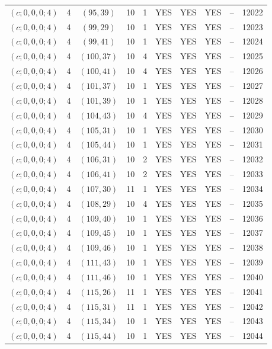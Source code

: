 \begin{longtable}{|c|c|c|c|c|c|c|c|c|c|}
$(c; 0, 0, 0; 4)$ & 4 & $(95, 39)$ & 10 & 1 & YES & YES & YES & -- & 12022\\
$(c; 0, 0, 0; 4)$ & 4 & $(99, 29)$ & 10 & 1 & YES & YES & YES & -- & 12023\\
$(c; 0, 0, 0; 4)$ & 4 & $(99, 41)$ & 10 & 1 & YES & YES & YES & -- & 12024\\
$(c; 0, 0, 0; 4)$ & 4 & $(100, 37)$ & 10 & 4 & YES & YES & YES & -- & 12025\\
$(c; 0, 0, 0; 4)$ & 4 & $(100, 41)$ & 10 & 4 & YES & YES & YES & -- & 12026\\
$(c; 0, 0, 0; 4)$ & 4 & $(101, 37)$ & 10 & 1 & YES & YES & YES & -- & 12027\\
$(c; 0, 0, 0; 4)$ & 4 & $(101, 39)$ & 10 & 1 & YES & YES & YES & -- & 12028\\
$(c; 0, 0, 0; 4)$ & 4 & $(104, 43)$ & 10 & 4 & YES & YES & YES & -- & 12029\\
$(c; 0, 0, 0; 4)$ & 4 & $(105, 31)$ & 10 & 1 & YES & YES & YES & -- & 12030\\
$(c; 0, 0, 0; 4)$ & 4 & $(105, 44)$ & 10 & 1 & YES & YES & YES & -- & 12031\\
$(c; 0, 0, 0; 4)$ & 4 & $(106, 31)$ & 10 & 2 & YES & YES & YES & -- & 12032\\
$(c; 0, 0, 0; 4)$ & 4 & $(106, 41)$ & 10 & 2 & YES & YES & YES & -- & 12033\\
$(c; 0, 0, 0; 4)$ & 4 & $(107, 30)$ & 11 & 1 & YES & YES & YES & -- & 12034\\
$(c; 0, 0, 0; 4)$ & 4 & $(108, 29)$ & 10 & 4 & YES & YES & YES & -- & 12035\\
$(c; 0, 0, 0; 4)$ & 4 & $(109, 40)$ & 10 & 1 & YES & YES & YES & -- & 12036\\
$(c; 0, 0, 0; 4)$ & 4 & $(109, 45)$ & 10 & 1 & YES & YES & YES & -- & 12037\\
$(c; 0, 0, 0; 4)$ & 4 & $(109, 46)$ & 10 & 1 & YES & YES & YES & -- & 12038\\
$(c; 0, 0, 0; 4)$ & 4 & $(111, 43)$ & 10 & 1 & YES & YES & YES & -- & 12039\\
$(c; 0, 0, 0; 4)$ & 4 & $(111, 46)$ & 10 & 1 & YES & YES & YES & -- & 12040\\
$(c; 0, 0, 0; 4)$ & 4 & $(115, 26)$ & 11 & 1 & YES & YES & YES & -- & 12041\\
$(c; 0, 0, 0; 4)$ & 4 & $(115, 31)$ & 11 & 1 & YES & YES & YES & -- & 12042\\
$(c; 0, 0, 0; 4)$ & 4 & $(115, 34)$ & 10 & 1 & YES & YES & YES & -- & 12043\\
$(c; 0, 0, 0; 4)$ & 4 & $(115, 44)$ & 10 & 1 & YES & YES & YES & -- & 12044\\

\end{longtable}
